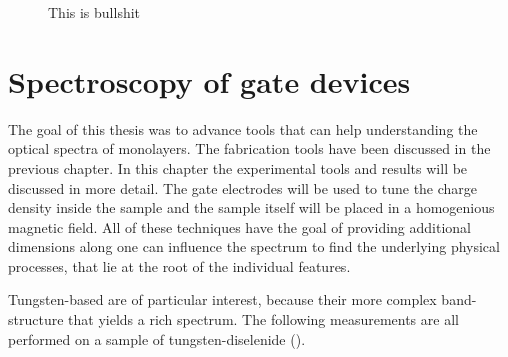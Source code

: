 \begin{figure}[h]
	\centering
	\caption{This is bullshit}
\end{figure}

\section{Spectroscopy of \wse gate devices}

The goal of this thesis was to advance tools that can help understanding the optical spectra of \tmdg monolayers. The fabrication tools have been discussed in the previous chapter. In this chapter the experimental tools and results will be discussed in more detail. The gate electrodes will be used to tune the charge density inside the sample and the sample itself will be placed in a homogenious magnetic field. All of these techniques have the goal of providing additional dimensions along one can influence the spectrum to find the underlying physical processes, that lie at the root of the individual features.

Tungsten-based \tmds are of particular interest, because their more complex band-structure that yields a rich spectrum. The following measurements are all performed on a sample of tungsten-diselenide (\wse\!).

